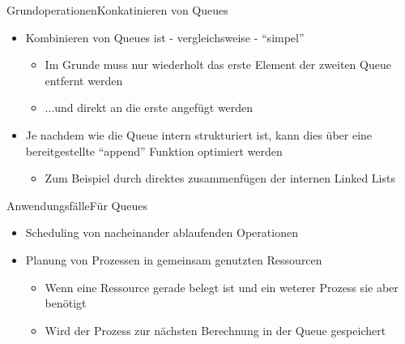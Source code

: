 \begin{frame}{Grundoperationen}{Konkatinieren von Queues}
	\begin{itemize}
		\item Kombinieren von Queues ist - vergleichsweise - "`simpel"'
		\begin{itemize}
			\item Im Grunde muss nur wiederholt das erste Element der zweiten Queue entfernt werden
			\item ...und direkt an die erste angefügt werden
		\end{itemize}
		\item Je nachdem wie die Queue intern strukturiert ist, kann dies über eine bereitgestellte "`append"' Funktion optimiert werden
		\begin{itemize}
			\item Zum Beispiel durch direktes zusammenfügen der internen Linked Lists
		\end{itemize}
	\end{itemize}
\end{frame}

\begin{frame}{Anwendungsfälle}{Für Queues}
	\begin{itemize}
		\item Scheduling von nacheinander ablaufenden Operationen
		\item Planung von Prozessen in gemeinsam genutzten Ressourcen
		\begin{itemize}
			\item Wenn eine Ressource gerade belegt ist und ein weterer Prozess sie aber benötigt
			\item Wird der Prozess zur nächsten Berechnung in der Queue gespeichert
		\end{itemize}
	\end{itemize}
\end{frame}
